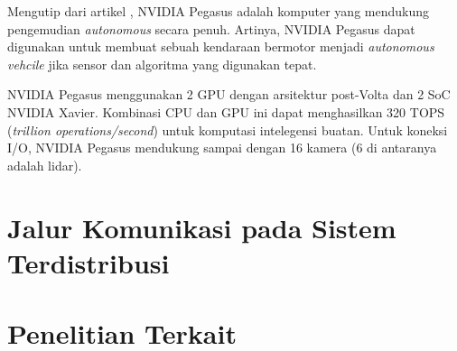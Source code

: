 Mengutip dari artikel \parencite{oh_2017}, NVIDIA Pegasus adalah komputer yang
mendukung pengemudian \textit{autonomous} secara penuh. Artinya, NVIDIA Pegasus
dapat digunakan untuk membuat sebuah kendaraan bermotor menjadi
\textit{autonomous vehcile} jika sensor dan algoritma yang digunakan tepat.

NVIDIA Pegasus menggunakan 2 GPU dengan arsitektur post-Volta dan 2 SoC NVIDIA
Xavier. Kombinasi CPU dan GPU ini dapat menghasilkan 320 TOPS (\textit{trillion
operations/second}) untuk komputasi intelegensi buatan. Untuk koneksi I/O,
NVIDIA Pegasus mendukung sampai dengan 16 kamera (6 di antaranya adalah lidar).

\section{Jalur Komunikasi pada Sistem Terdistribusi}
\blindtext

\section{Penelitian Terkait}
\blindtext

